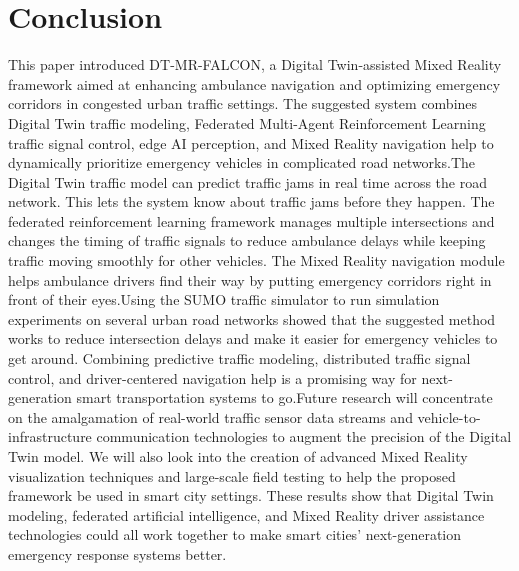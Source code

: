 \documentclass[conference]{IEEEtran}
\begin{document}
\section{Conclusion}
This paper introduced DT-MR-FALCON, a Digital Twin-assisted Mixed Reality framework aimed at enhancing ambulance navigation and optimizing emergency corridors in congested urban traffic settings. The suggested system combines Digital Twin traffic modeling, Federated Multi-Agent Reinforcement Learning traffic signal control, edge AI perception, and Mixed Reality navigation help to dynamically prioritize emergency vehicles in complicated road networks.The Digital Twin traffic model can predict traffic jams in real time across the road network. This lets the system know about traffic jams before they happen. The federated reinforcement learning framework manages multiple intersections and changes the timing of traffic signals to reduce ambulance delays while keeping traffic moving smoothly for other vehicles. The Mixed Reality navigation module helps ambulance drivers find their way by putting emergency corridors right in front of their eyes.Using the SUMO traffic simulator to run simulation experiments on several urban road networks showed that the suggested method works to reduce intersection delays and make it easier for emergency vehicles to get around. Combining predictive traffic modeling, distributed traffic signal control, and driver-centered navigation help is a promising way for next-generation smart transportation systems to go.Future research will concentrate on the amalgamation of real-world traffic sensor data streams and vehicle-to-infrastructure communication technologies to augment the precision of the Digital Twin model. We will also look into the creation of advanced Mixed Reality visualization techniques and large-scale field testing to help the proposed framework be used in smart city settings. These results show that Digital Twin modeling, federated artificial intelligence, and Mixed Reality driver assistance technologies could all work together to make smart cities' next-generation emergency response systems better.

\end{document}
